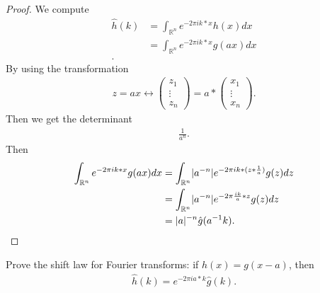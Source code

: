 \begin{proof}
 We compute 
 \begin{align*}
   \hat{h}(k)  &= \int_{\mathbb{R}^{n} } e^{-2\pi ik*x}h(x) dx  \\
               &=   \int_{\mathbb{R}^{n} } e^{-2\pi ik*x}g(ax) dx  \\
 .\end{align*}
 By using the transformation
 \begin{align*}
  z = ax \leftrightarrow \begin{pmatrix} z_{1} \\ \vdots \\ z_n \end{pmatrix}  = a*\begin{pmatrix} x_{1} \\ \vdots \\ x_n \end{pmatrix} 
 .\end{align*}
 Then we get the determinant 
 \begin{align*}
  \frac{1}{a^{n} } 
 .\end{align*}
  Then
 \begin{align*}
   \int_{\mathbb{R}^{n} } e^{-2\pi ik*x}g(ax) dx  &=   \int_{\mathbb{R}^{n} }\lvert a^{-n}  \rvert e^{-2\pi ik*(z*\frac{1}{a})}g(z) dz \\
                                                  &=   \int_{\mathbb{R}^{n} }\lvert a^{-n}  \rvert e^{-2\pi \frac{ik}{a}*z}g(z) dz \\
                                                  &= \lvert a\rvert^{-n}\hat{g}(a^{-1}k ) 
 .\end{align*}
\end{proof}
\begin{exercise}[d]
 Prove the shift law for Fourier transforms: if $h(x) = g(x-a)$, then
 \begin{align*}
  \hat{h}(k) =e^{-2\pi ia*k} \hat{g}(k) 
 .\end{align*}
\end{exercise}
